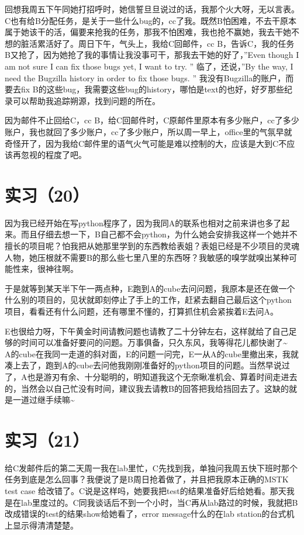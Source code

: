 \documentclass[12pt]{book}
\begin{document}
回想我周五下午同她打招呼时，她信誓旦旦说过的话，我那个火大呀，无以言表。C也有给B分配任务，是关于一些什么bug的，cc了我。既然B怕困难，不去干原本属于她该干的活，偏要来抢我的任务，那我不怕困难，我也抢不赢她，我去干她不想的脏活累活好了。周日下午，气头上，我给C回邮件，cc B，告诉C，我的任务B又抢了，因为她抢了我的事情让我没事可干，那我去干她的好了，”Even though I am not sure I can fix those bugs yet, I want to try. ” 临了，还说，”By the way, I need the Bugzilla history in order to fix those bugs. ” 我没有Bugzilla的账户，而要去fix B的这些bug，我需要这些bug的history，哪怕是text的也好，好歹那些纪录可以帮助我追踪朔源，找到问题的所在。

因为邮件不止回给C，cc B，给C回邮件时，C原邮件里原本有多少账户，cc了多少账户，我也就回了多少账户，cc了多少账户，所以周一早上，office里的气氛早就奇怪开了，因为我给C邮件里的语气火气可能是难以控制的大，应该是大到C不应该再忽视的程度了吧。

\section{实习（20）}
\label{sec-5-23}

因为我已经开始在写python程序了，因为我同A的联系也相对之前来讲也多了起来。而且仔细去想一下，B自己都不会python，为什么她会安排我这样一个她并不擅长的项目呢？怕我把从她那里学到的东西教给表姐？表姐已经是不少项目的灵魂人物，她压根就不需要B的那么些七里八里的东西呀？我敏感的嗅学就嗅出某种可能性来，很神往啊。

于是就等到某天半下午一两点种，E跑到A的cube去问问题，我原本是还在做一个什么别的项目的，见状就即刻停止了手上的工作，赶紧去翻自己最后这个python项目，看看还有什么问题，还有哪里不懂的，打算抓住机会紧挨着E去问A。　

E也很给力呀，下午黄金时间请教问题也请教了二十分钟左右，这样就给了自己足够的时间可以准备好要问的问题。万事俱备，只久东风，我等得花儿都快谢了\textasciitilde{}~ A的cube在我同一走道的斜对面，E的问题一问完，E一从A的cube里撤出来，我就凑上去了，跑到A的cube去问他我刚刚准备好的python项目的问题。当然早说过了，A也是游刃有余、十分聪明的，明知道我这个无奈瞅准机会、算着时间走进去的，当然会以自己忙没有时间，建议我去请教B的回答把我给挡回去了。这缺的就是一道过继手续嘛\textasciitilde{}~　

\section{实习（21）}
\label{sec-5-24}

给C发邮件后的第二天周一我在lab里忙，C先找到我，单独问我周五快下班时那个任务到底是怎么回事？我便说了是B周日抢着做了，并且把我原本正确的MSTK test case 给改错了。C说是这样吗，她要我把test的结果准备好后给她看。那天我是在lab里度过的。C同我谈话后不到一个小时，当C再从lab路过的时候，我就把B改成错误的test的结果show给她看了，error message什么的在lab station的台式机上显示得清清楚楚。
\end{document}
